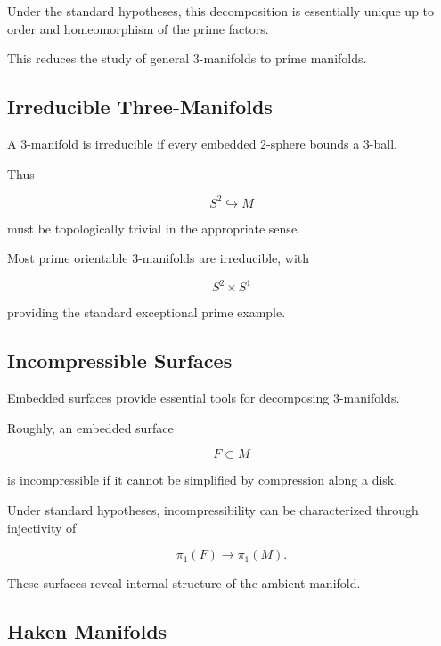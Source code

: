 Under the standard hypotheses, this decomposition is essentially unique up
to order and homeomorphism of the prime factors.

This reduces the study of general \(3\)-manifolds to prime manifolds.

\subsection{Irreducible Three-Manifolds}
\label{subsec:irreducible-three-manifolds}

A \(3\)-manifold is irreducible if every embedded \(2\)-sphere bounds a
\(3\)-ball.

Thus

\[
\boxed{
S^2\hookrightarrow M
}
\]

must be topologically trivial in the appropriate sense.

Most prime orientable \(3\)-manifolds are irreducible, with

\[
S^2\times S^1
\]

providing the standard exceptional prime example.

\subsection{Incompressible Surfaces}
\label{subsec:incompressible-surfaces}

Embedded surfaces provide essential tools for decomposing \(3\)-manifolds.

Roughly, an embedded surface

\[
F\subset M
\]

is incompressible if it cannot be simplified by compression along a disk.

Under standard hypotheses, incompressibility can be characterized through
injectivity of

\[
\boxed{
\pi_1(F)\longrightarrow\pi_1(M).
}
\]

These surfaces reveal internal structure of the ambient manifold.

\subsection{Haken Manifolds}
\label{subsec:haken-manifolds}

